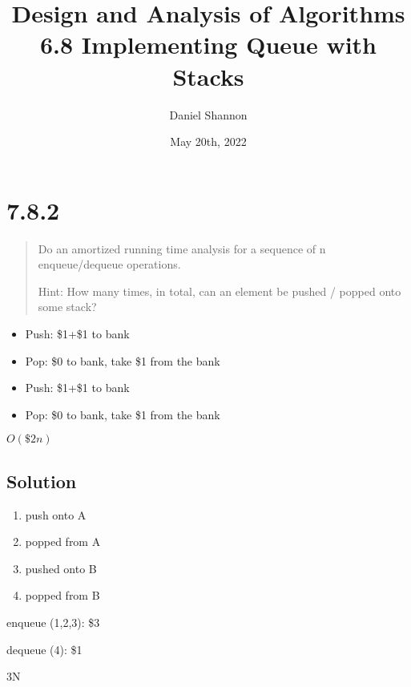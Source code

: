 \documentclass[12pt, letterpaper, twoside]{article}
\title{%
Design and Analysis of Algorithms\\
\large 6.8 Implementing Queue with Stacks
}
\author{Daniel Shannon}
\date{May 20th, 2022}
\begin{document}
\begin{titlepage}
\maketitle
\end{titlepage}

\section*{7.8.2}
\begin{quote}
Do an amortized running time analysis for a sequence of n enqueue/dequeue operations.

Hint: How many times, in total, can an element be pushed / popped onto some stack?
\end{quote}
\begin{itemize}
    \item Push: \$1+\$1 to bank
    \item Pop:  \$0 to bank, take \$1 from the bank
    \item Push: \$1+\$1 to bank
    \item Pop:  \$0 to bank, take \$1 from the bank
\end{itemize}
$O(\$2n)$

\subsection*{Solution}
\begin{enumerate}
    \item push onto A
    \item popped from A 
    \item pushed onto B
    \item popped from B
\end{enumerate}

enqueue (1,2,3): \$3

dequeue (4): \$1

3N
\end{document}

